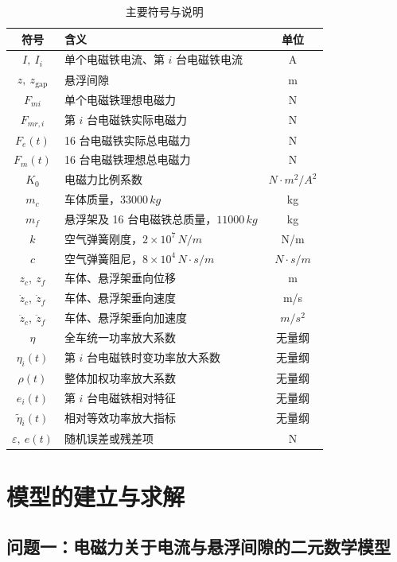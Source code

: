 \documentclass[a4paper]{nmmcm}
\begin{document}
\FloatBarrier
\begin{table}[H]
\centering
\small
\renewcommand{\arraystretch}{1.35}
\caption{主要符号与说明}
\label{tab:symbols}
\begin{tabular}{c p{8cm} c}
\hline
符号 & 含义 & 单位 \\
\hline
$I,\ I_i$ & 单个电磁铁电流、第 $i$ 台电磁铁电流 & A \\
$z,\ z_{\text{gap}}$ & 悬浮间隙 & m \\
$F_{mi}$ & 单个电磁铁理想电磁力 & N \\
$F_{mr,i}$ & 第 $i$ 台电磁铁实际电磁力 & N \\
$F_e(t)$ & 16 台电磁铁实际总电磁力 & N \\
$F_m(t)$ & 16 台电磁铁理想总电磁力 & N \\
$K_0$ & 电磁力比例系数 & $N\cdot m^2/A^2$ \\
$m_c$ & 车体质量，$33000\,kg$ & kg \\
$m_f$ & 悬浮架及 16 台电磁铁总质量，$11000\,kg$ & kg \\
$k$ & 空气弹簧刚度，$2\times10^7\,N/m$ & N/m \\
$c$ & 空气弹簧阻尼，$8\times10^4\,N\cdot s/m$ & $N\cdot s/m$ \\
$z_c,\ z_f$ & 车体、悬浮架垂向位移 & m \\
$\dot{z}_c,\ \dot{z}_f$ & 车体、悬浮架垂向速度 & m/s \\
$\ddot{z}_c,\ \ddot{z}_f$ & 车体、悬浮架垂向加速度 & $m/s^2$ \\
$\eta$ & 全车统一功率放大系数 & 无量纲 \\
$\eta_i(t)$ & 第 $i$ 台电磁铁时变功率放大系数 & 无量纲 \\
$\rho(t)$ & 整体加权功率放大系数 & 无量纲 \\
$e_i(t)$ & 第 $i$ 台电磁铁相对特征 & 无量纲 \\
$\tilde{\eta}_i(t)$ & 相对等效功率放大指标 & 无量纲 \\
$\varepsilon,\ e(t)$ & 随机误差或残差项 & N \\
\hline
\end{tabular}
\end{table}
\FloatBarrier

\section{模型的建立与求解}

\subsection{问题一：电磁力关于电流与悬浮间隙的二元数学模型}
\end{document}
